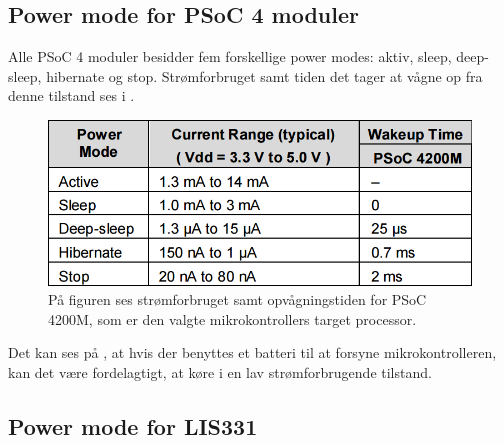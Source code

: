 \subsection{Power mode for PSoC 4 moduler}
Alle PSoC 4 moduler besidder fem forskellige power modes: aktiv, sleep, deep-sleep, hibernate og stop. Strømforbruget samt tiden det tager at vågne op fra denne tilstand ses i . 
\begin{figure}[H]
	\centering
	\includegraphics[scale=0.75]{figures/bProblemloesning/PowerMode.png}
	\caption{På figuren ses strømforbruget samt opvågningstiden for PSoC 4200M, som er den valgte mikrokontrollers target processor.}
	\label{fig:Powermode}
\end{figure}\vspace{-0.2cm}
Det kan ses på , at hvis der benyttes et batteri til at forsyne mikrokontrolleren, kan det være fordelagtigt, at køre i en lav strømforbrugende tilstand. %

\subsection{Power mode for LIS331}
